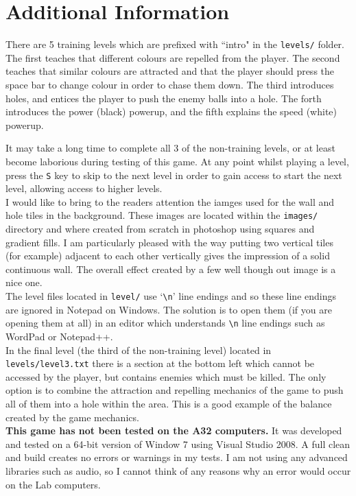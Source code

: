 \section{Additional Information}

There are 5 training levels which are prefixed with ``intro" in the \verb!levels/! folder. The first teaches that different colours are repelled from the player. The second teaches that similar colours are attracted and that the player should press the space bar to change colour in order to chase them down. The third introduces holes, and entices the player to push the enemy balls into a hole. The forth introduces the power (black) powerup, and the fifth explains the speed (white) powerup.

It may take a long time to complete all 3 of the non-training levels, or at least become laborious during testing of this game. At any point whilst playing a level, press the \verb!S! key to skip to the next level in order to gain access to start the next level, allowing access to higher levels. \\

I would like to bring to the readers attention the iamges used for the wall and hole tiles in the background. These images are located within the \verb!images/! directory and where created from scratch in photoshop using squares and gradient fills. I am particularly pleased with the way putting two vertical tiles (for example) adjacent to each other vertically gives the impression of a solid continuous wall. The overall effect created by a few well though out image is a nice one. \\

The level files located in \verb!level/! use `\verb!\n!' line endings and so these line endings are ignored in Notepad on Windows. The solution is to open them (if you are opening them at all) in an editor which understands \verb!\n! line endings such as WordPad or Notepad++. \\

In the final level (the third of the non-training level) located in \verb!levels/level3.txt! there is a section at the bottom left which cannot be accessed by the player, but contains enemies which must be killed. The only option is to combine the attraction and repelling mechanics of the game to push all of them into a hole within the area. This is a good example of the balance created by the game mechanics. \\

{\bf This game has not been tested on the A32 computers.} It was developed and tested on a 64-bit version of Window 7 using Visual Studio 2008. A full clean and build creates no errors or warnings in my tests. I am not using any advanced libraries such as audio, so I cannot think of any reasons why an error would occur on the Lab computers.

